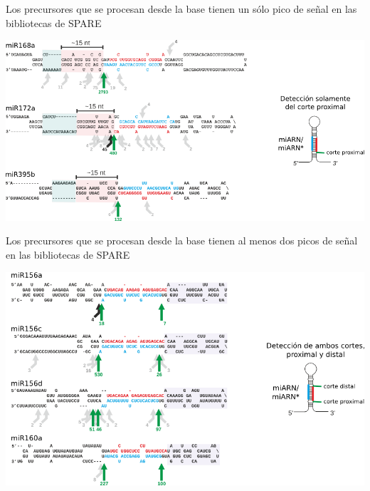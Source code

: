 \documentclass{beamer}
\begin{document}
\begin{frame}{Los precursores que se procesan desde la base tienen un sólo pico de señal en las bibliotecas de SPARE}
	\begin{center}
		\includegraphics[width=.8\textwidth]{img/GR_fig2A.png}
	\end{center}
\end{frame}

\begin{frame}{Los precursores que se procesan desde la base tienen al menos dos picos de señal en las bibliotecas de SPARE}
	\begin{center}
		\includegraphics[width=.7\textwidth]{img/GR_fig4A.png}
	\end{center}
\end{frame}
\end{document}
